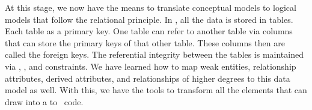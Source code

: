 %
%
At this stage, we now have the means to translate conceptual models to logical models that follow the relational principle.
In , all the data is stored in tables.
Each table as a primary key.
One table can refer to another table via columns that can store the primary keys of that other table.
These columns then are called the foreign keys.
The referential integrity between the tables is maintained via , , and  constraints.
We have learned how to map weak entities, relationship attributes, derived attributes, and relationships of higher degrees to this data model as well.
With this, we have the tools to transform all the elements that can draw into a  to \sql\ code.%
%
\endhsection%
%
